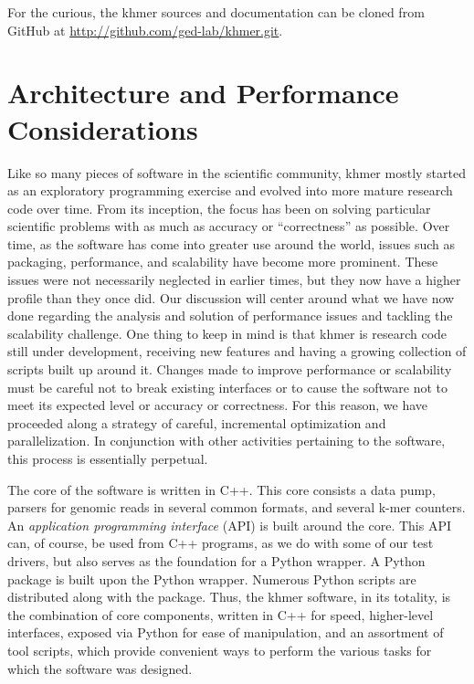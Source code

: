 \documentclass{article}
\begin{document}
For the curious, the khmer sources and documentation can be cloned from GitHub at \url{http://github.com/ged-lab/khmer.git}.

\section{Architecture and Performance Considerations}

Like so many pieces of software in the scientific community, khmer mostly started as an exploratory programming exercise and evolved into more mature research code over time. From its inception, the focus has been on solving particular scientific problems with as much as accuracy or ``correctness'' as possible. Over time, as the software has come into greater use around the world, issues such as packaging, performance, and scalability have become more prominent. These issues were not necessarily neglected in earlier times, but they now have a higher profile than they once did. Our discussion will center around what we have now done regarding the analysis and solution of performance issues and tackling the scalability challenge. One thing to keep in mind is that khmer is research code still under development, receiving new features and having a growing collection of scripts built up around it. Changes made to improve performance or scalability must be careful not to break existing interfaces or to cause the software not to meet its expected level or accuracy or correctness. For this reason, we have proceeded along a strategy of careful, incremental optimization and parallelization. In conjunction with other activities pertaining to the software, this process is essentially perpetual.


The core of the software is written in C++. This core consists a data pump, parsers for genomic reads in several common formats, and several k-mer counters. An \textit{application programming interface} (API) is built around the core. This API can, of course, be used from C++ programs, as we do with some of our test drivers, but also serves as the foundation for a Python wrapper. A Python package is built upon the Python wrapper. Numerous Python scripts are distributed along with the package. Thus, the khmer software, in its totality, is the combination of core components, written in C++ for speed, higher-level interfaces, exposed via Python for ease of manipulation, and an assortment of tool scripts, which provide convenient ways to perform the various tasks for which the software was designed.
\end{document}
